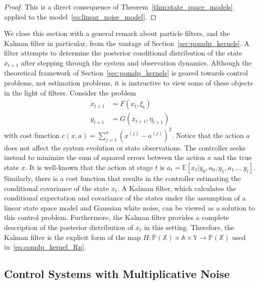 \documentclass[11pt,onecolumn]{IEEEtran}  %
\newcommand{\Ab}{\mathbb{A}}
\newcommand{\Eb}{\mathbb{E}}
\newcommand{\Pb}{\mathbb{P}}
\newcommand{\Xb}{\mathbb{X}}
\newcommand{\Yb}{\mathbb{Y}}
\theoremstyle{definition}
\begin{document}
\begin{proof}
    This is a direct consequence of Theorem~\ref{thm:state_space_models} applied to the model~\eqref{eq:linear_noise_model}.
\end{proof}

We close this section with a general remark about particle filters, and the Kalman filter in particular, from the vantage of Section~\ref{sec:pomdp_kernels}. A filter attempts to determine the posterior conditional distribution of the state $x_{t+1}$ after stepping through the system and observation dynamics. Although the theoretical framework of Section~\ref{sec:pomdp_kernels} is geared towards control problems, not estimation problems, it is instructive to view some of these objects in the light of filters. Consider the problem
\begin{subequations} \label{eq:filters_as_control}
    \begin{align}
        x_{t+1} &= F(x_t, \xi_t) \\
        y_{t+1} &= G(x_{t+1}, \eta_{t+1})
    \end{align}
\end{subequations}
with cost function $c(x,a) = \sum_{j=1}^{n} (x^{(j)} - a^{(j)})^2$. Notice that the action $a$ does not affect the system evolution or state observations. The controller seeks instead to minimize the sum of squared errors between the action $a$ and the true state $x$. It is well-known that the action at stage $t$ is $a_t = \Eb[x_t|y_0, a_0, y_1, a_1 \dots, y_t]$. Similarly, there is a cost function that results in the controller estimating the conditional covariance of the state $x_t$. A Kalman filter, which calculates the conditional expectation and covariance of the states under the assumption of a linear state space model and Gaussian white noise, can be viewed as a solution to this control problem. Furthermore, the Kalman filter provides a complete description of the posterior distribution of $x_t$ in this setting. Therefore, the Kalman filter is the explicit form of the map $H : \Pb(\Xb) \times \Ab \times \Yb \to \Pb(\Xb)$ used in~\eqref{eq:comdp_kernel_Rn}.


\subsection{Control Systems with Multiplicative Noise} \label{subsec:multiplicative_noise}
\end{document}
